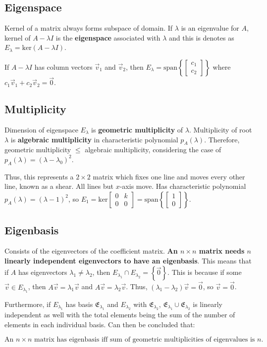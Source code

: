 \subsection{Eigenspace}

Kernel of a matrix always forms subspace of domain. If $\lambda$ is an eigenvalue for $A$,
kernel of $A-\lambda I$ is the \textbf{eigenspace} associated with $\lambda$ and 
this is denotes as $E_\lambda=\mathrm{ker}(A-\lambda I)$.

If $A-\lambda I$ has column vectors $\vec{v}_1$ and $\vec{v}_2$, then 
$E_\lambda=\mathrm{span}\left\{\begin{bmatrix}c_1\\c_2\end{bmatrix}\right\}$ where $c_1\vec{v}_1+c_2\vec{v}_2=\vec{0}$.

\subsection{Multiplicity}

Dimension of eigenspace $E_\lambda$ is \textbf{geometric multiplicity} of $\lambda$.
Multiplicity of root $\lambda$ is \textbf{algebraic multiplicity} in characteristic polynomial $p_A(\lambda)$.
Therefore, geometric multiplicity $\leq$ algebraic multiplicity, considering the case of $p_A(\lambda)=(\lambda-\lambda_0)^2$.

Thus, this represents a $2\times 2$ matrix which fixes one line and moves every other line, known as a shear. All lines but $x$-axis move.
Has characteristic polynomial $p_A(\lambda)=(\lambda-1)^2$, so $E_1=\mathrm{ker}\begin{bmatrix}0&k\\0&0\end{bmatrix}=\mathrm{span}\left\{\begin{bmatrix}1\\0\end{bmatrix}\right\}$.

\subsection{Eigenbasis}

Consists of the eigenvectors of the coefficient matrix. \textbf{An $n\times n$ matrix needs $n$ linearly independent
eigenvectors to have an eigenbasis}. This means that if $A$ has eigenvectors $\lambda_1\neq\lambda_2$, then $E_{\lambda_1}\cap E_{\lambda_2}=\left\{\vec{0}\right\}$.
This is because if some $\vec{v}\in E_{\lambda_1}$, then $A\vec{v}=\lambda_1\vec{v}$ and $A\vec{v}=\lambda_2\vec{v}$.
Thus, $(\lambda_1-\lambda_2)\vec{v}=\vec{0}$, so $\vec{v}=\vec{0}$.

\noindent
Furthermore, if $E_{\lambda_1}$ has basis $\mathfrak{E}_{\lambda_1}$ and $E_{\lambda_2}$ with $\mathfrak{E}_{\lambda_2}$, $\mathfrak{E}_{\lambda_1}\cup \mathfrak{E}_{\lambda_2}$ is linearly independent as well 
with the total elements being the sum of the number of elements in each individual basis.
Can then be concluded that:

$$
\boxed{\text{An $n\times n$ matrix has eigenbasis iff sum of geometric multiplicities of eigenvalues is $n$.}}
$$